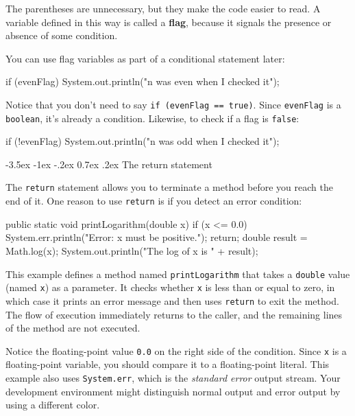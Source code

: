 \documentclass[12pt]{book}
\makeatletter
\theoremstyle{exercise}
\newcommand{\java}[1]{\verb"#1"}
\renewcommand{\section}{\@startsection {section}{1}{\z@}%
    {-3.5ex \@plus -1ex \@minus -.2ex}%
    {0.7ex \@plus.2ex}%
    {\normalfont\Large\bfseries}}
\newcommand{\java}[1]{\lstinline{#1}} %
\makeatother
\begin{document}
The parentheses are unnecessary, but they make the code easier to read.
A variable defined in this way is called a {\bf flag}, because it signals the presence or absence of some condition.

You can use flag variables as part of a conditional statement later:

\begin{code}
    if (evenFlag) {
        System.out.println("n was even when I checked it");
    }
\end{code}

Notice that you don't need to say \java{if (evenFlag == true)}.
Since \java{evenFlag} is a \java{boolean}, it's already a condition.
Likewise, to check if a flag is \java{false}:

\begin{code}
    if (!evenFlag) {
        System.out.println("n was odd when I checked it");
    }
\end{code}


\section{The return statement}


The \java{return} statement allows you to terminate a method before you reach the end of it.
One reason to use \java{return} is if you detect an error condition:

\begin{code}
    public static void printLogarithm(double x) {
        if (x <= 0.0) {
            System.err.println("Error: x must be positive.");
            return;
        }
        double result = Math.log(x);
        System.out.println("The log of x is " + result);
    }
\end{code}

This example defines a method named \java{printLogarithm} that takes a \java{double} value (named \java{x}) as a parameter.
It checks whether \java{x} is less than or equal to zero, in which case it prints an error message and then uses \java{return} to exit the method.
The flow of execution immediately returns to the caller, and the remaining lines of the method are not executed.


Notice the floating-point value \java{0.0} on the right side of the condition.
Since \java{x} is a floating-point variable, you should compare it to a floating-point literal.
This example also uses \java{System.err}, which is the {\it standard error} output stream.
Your development environment might distinguish normal output and error output by using a different color.
\end{document}
